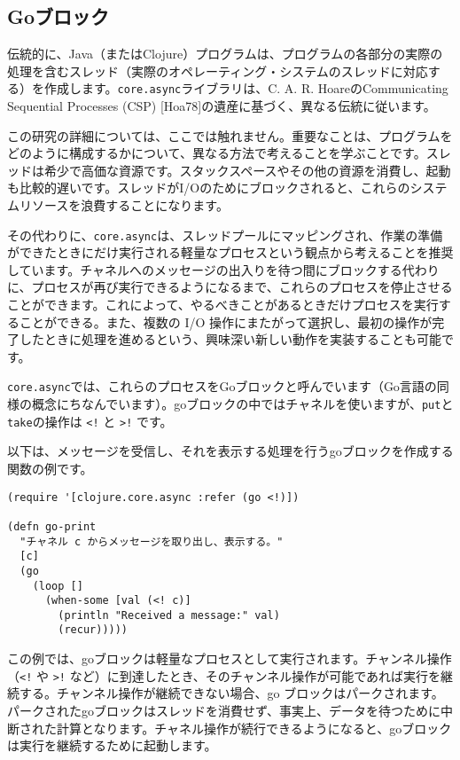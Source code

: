 \subsection{Goブロック}

伝統的に、Java（またはClojure）プログラムは、プログラムの各部分の実際の処理を含むスレッド（実際のオペレーティング・システムのスレッドに対応する）を作成します。\texttt{core.async}ライブラリは、C. A. R. HoareのCommunicating Sequential Processes (CSP) [Hoa78]の遺産に基づく、異なる伝統に従います。

この研究の詳細については、ここでは触れません。重要なことは、プログラムをどのように構成するかについて、異なる方法で考えることを学ぶことです。スレッドは希少で高価な資源です。スタックスペースやその他の資源を消費し、起動も比較的遅いです。スレッドがI/Oのためにブロックされると、これらのシステムリソースを浪費することになります。

その代わりに、\texttt{core.async}は、スレッドプールにマッピングされ、作業の準備ができたときにだけ実行される軽量なプロセスという観点から考えることを推奨しています。チャネルへのメッセージの出入りを待つ間にブロックする代わりに、プロセスが再び実行できるようになるまで、これらのプロセスを停止させることができます。これによって、やるべきことがあるときだけプロセスを実行することができる。また、複数の I/O 操作にまたがって選択し、最初の操作が完了したときに処理を進めるという、興味深い新しい動作を実装することも可能です。

\texttt{core.async}では、これらのプロセスをGoブロックと呼んでいます（Go言語の同様の概念にちなんでいます）。goブロックの中ではチャネルを使いますが、\texttt{put}と\texttt{take}の操作は \texttt{<!} と \texttt{>!} です。

以下は、メッセージを受信し、それを表示する処理を行うgoブロックを作成する関数の例です。

\begin{lstlisting}[numbers=none]
(require '[clojure.core.async :refer (go <!)])

(defn go-print
  "チャネル c からメッセージを取り出し、表示する。"
  [c]
  (go
    (loop []
      (when-some [val (<! c)]
        (println "Received a message:" val)
        (recur)))))
\end{lstlisting}

この例では、goブロックは軽量なプロセスとして実行されます。チャンネル操作（\texttt{<!} や \texttt{>!} など）に到達したとき、そのチャンネル操作が可能であれば実行を継続する。チャンネル操作が継続できない場合、go ブロックはパークされます。パークされたgoブロックはスレッドを消費せず、事実上、データを待つために中断された計算となります。チャネル操作が続行できるようになると、goブロックは実行を継続するために起動します。

